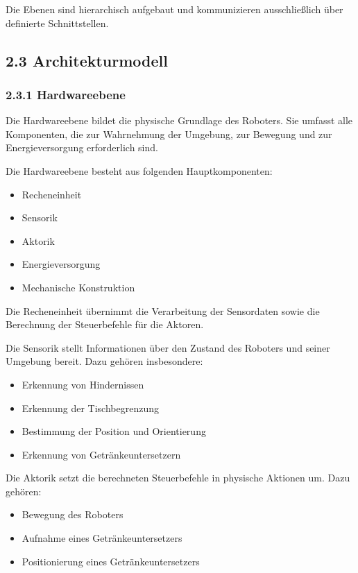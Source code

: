 \documentclass[
  a4paper,
  12pt,
  DIV=12,        %
  parskip=half,  %
  headings=small %
]{scrartcl}
\theoremstyle{definition}
\providecommand{\tightlist}{%
  \setlength{\itemsep}{0pt}\setlength{\parskip}{0pt}}
\theoremstyle{definition}
\providecommand{\tightlist}{%
  \setlength{\itemsep}{0pt}\setlength{\parskip}{0pt}}
\begin{document}
Die Ebenen sind hierarchisch aufgebaut und kommunizieren ausschließlich
über definierte Schnittstellen.

\subsection{2.3 Architekturmodell}\label{architekturmodell}

\subsubsection{2.3.1 Hardwareebene}\label{hardwareebene-1}

Die Hardwareebene bildet die physische Grundlage des Roboters. Sie
umfasst alle Komponenten, die zur Wahrnehmung der Umgebung, zur Bewegung
und zur Energieversorgung erforderlich sind.

Die Hardwareebene besteht aus folgenden Hauptkomponenten:

\begin{itemize}
\tightlist
\item
  Recheneinheit
\item
  Sensorik
\item
  Aktorik
\item
  Energieversorgung
\item
  Mechanische Konstruktion
\end{itemize}

Die Recheneinheit übernimmt die Verarbeitung der Sensordaten sowie die
Berechnung der Steuerbefehle für die Aktoren.

Die Sensorik stellt Informationen über den Zustand des Roboters und
seiner Umgebung bereit. Dazu gehören insbesondere:

\begin{itemize}
\tightlist
\item
  Erkennung von Hindernissen
\item
  Erkennung der Tischbegrenzung
\item
  Bestimmung der Position und Orientierung
\item
  Erkennung von Getränkeuntersetzern
\end{itemize}

Die Aktorik setzt die berechneten Steuerbefehle in physische Aktionen
um. Dazu gehören:

\begin{itemize}
\tightlist
\item
  Bewegung des Roboters
\item
  Aufnahme eines Getränkeuntersetzers
\item
  Positionierung eines Getränkeuntersetzers
\end{itemize}
\end{document}
